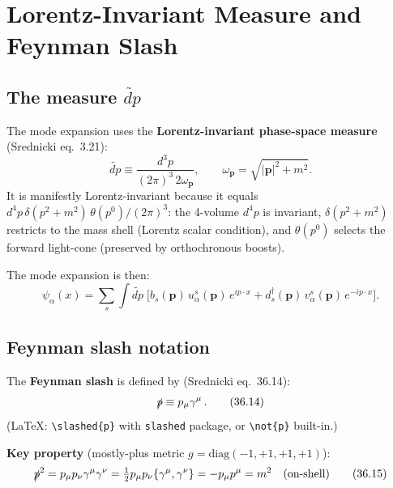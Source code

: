 \section{Lorentz-Invariant Measure and Feynman Slash}

\subsection{The measure \texorpdfstring{$\widetilde{dp}$}{dp-tilde}}

The mode expansion uses the \textbf{Lorentz-invariant phase-space measure}
(Srednicki eq.~3.21):
\begin{equation}
  \widetilde{dp} \equiv \frac{d^3p}{(2\pi)^3\,2\omega_{\mathbf{p}}},
  \qquad \omega_{\mathbf{p}} = \sqrt{|\mathbf{p}|^2 + m^2}.
  \tag{3.21}
\end{equation}
It is manifestly Lorentz-invariant because it equals
$d^4p\,\delta(p^2+m^2)\,\theta(p^0)/(2\pi)^3$:
the 4-volume $d^4p$ is invariant, $\delta(p^2+m^2)$ restricts to the mass shell
(Lorentz scalar condition), and $\theta(p^0)$ selects the forward light-cone
(preserved by orthochronous boosts).

The mode expansion is then:
\begin{equation}
  \psi_\alpha(x) = \sum_s \int\!\widetilde{dp}\;
  \bigl[b_s(\mathbf{p})\,u^s_\alpha(\mathbf{p})\,e^{ip\cdot x}
       + d^\dagger_s(\mathbf{p})\,v^s_\alpha(\mathbf{p})\,e^{-ip\cdot x}\bigr].
\end{equation}

\subsection{Feynman slash notation}

The \textbf{Feynman slash} is defined by (Srednicki eq.~36.14):
\begin{equation}
  \slashed{p} \equiv p_\mu\gamma^\mu\,.
  \tag{36.14}
\end{equation}
(LaTeX: \verb|\slashed{p}| with \texttt{slashed} package, or \verb|\not{p}| built-in.)

\medskip
\textbf{Key property} (mostly-plus metric $g=\mathrm{diag}(-1,+1,+1,+1)$):
\begin{equation}
  \slashed{p}^2 = p_\mu p_\nu \gamma^\mu\gamma^\nu
  = \tfrac{1}{2}p_\mu p_\nu\{\gamma^\mu,\gamma^\nu\}
  = -p_\mu p^\mu = m^2 \quad(\text{on-shell})
  \tag{36.15}
\end{equation}

